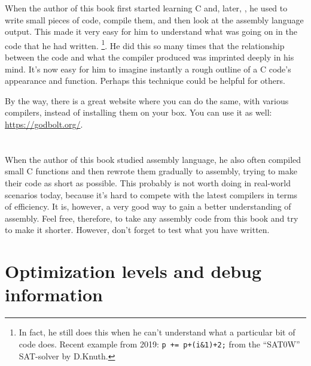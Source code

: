 
When the author of this book first started learning C and, later, \Cpp, he used to write small pieces of code, compile them,
and then look at the assembly language output. This made it very easy for him to understand what was going on in the code that he had written.
\footnote{In fact, he still does this when he can't understand what a particular bit of code does.
Recent example from 2019: \verb|p += p+(i&1)+2;| from the ``SAT0W'' SAT-solver by D.Knuth.}.
He did this so many times that the relationship between the \CCpp code and what the compiler produced was imprinted deeply in his mind.
It's now easy for him to imagine instantly a rough outline of a C code's appearance and function.
Perhaps this technique could be helpful for others.


By the way, there is a great website where you can do the same, with various compilers, instead of installing them on your box.
You can use it as well: \url{https://godbolt.org/}.

\section*{\Exercises}

When the author of this book studied assembly language, he also often compiled small C functions and then rewrote
them gradually to assembly, trying to make their code as short as possible.
This probably is not worth doing in real-world scenarios today,
because it's hard to compete with the latest compilers in terms of efficiency. It is, however, a very good way to gain a better understanding of assembly.
Feel free, therefore, to take any assembly code from this book and try to make it shorter.
However, don't forget to test what you have written.

\section*{Optimization levels and debug information}

